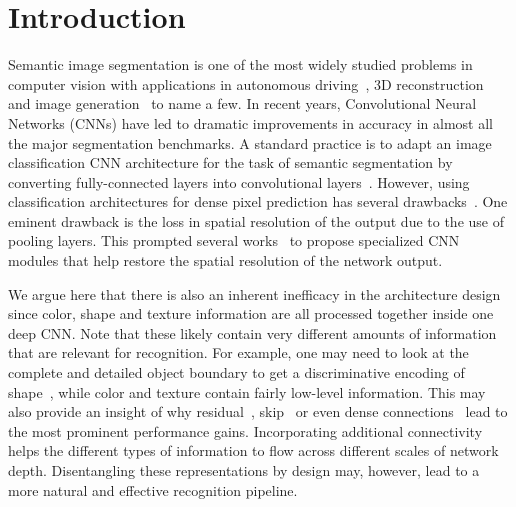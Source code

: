 \documentclass[10pt,twocolumn,letterpaper]{article}
\begin{document}
\vspace{-2mm}
\vspace{-3mm}
\section{Introduction}
\label{sec:intro}

Semantic image segmentation is one of the most widely studied problems in computer vision with applications 
in 
autonomous driving~\cite{pohlen2016full,kitti,ZhangCVPR16}, 
3D reconstruction ~\cite{MalikM89,Lee2009GeometricRF}
 and image generation~\cite{pix2pix2016,wang2018pix2pixHD} to name 
 a few.
In recent years, Convolutional Neural Networks (CNNs) have led to dramatic improvements in accuracy in almost all the major  segmentation  benchmarks.
A standard practice is to adapt an image classification CNN architecture for the task of semantic segmentation by converting fully-connected layers into convolutional layers~\cite{LongCVPR2015}.
However, using classification architectures for dense pixel prediction has several drawbacks~\cite{dilation,LongCVPR2015,pspnet,deeplabv3plus2018}. One eminent drawback is the loss in spatial resolution of the output due to the use of pooling layers. 
This prompted
several works~\cite{dilation,pspnet,gadde2016superpixel,liu2017learning,huang2017densely} to propose specialized CNN modules 
that help restore the spatial resolution of the network output.

We argue here that there is also an inherent inefficacy in the architecture design since color, shape and texture information are 
    all  processed together inside one deep CNN. Note that these likely contain very different amounts of information that are relevant for recognition. For example, one may need to look at the complete and detailed object boundary to get a discriminative encoding of shape~\cite{PolygonPP2018,curvegcn}, while color and texture contain fairly low-level information. This may also provide an insight of why residual~\cite{he15deepresidual}, skip~\cite{he15deepresidual,yu2018deep} or even dense connections~\cite{huang2017densely} lead to the most prominent performance gains. Incorporating additional connectivity helps the different types of information to flow across different scales of network depth. 
    Disentangling these representations by design may, however, lead to a more natural and effective recognition pipeline. 
\end{document}
